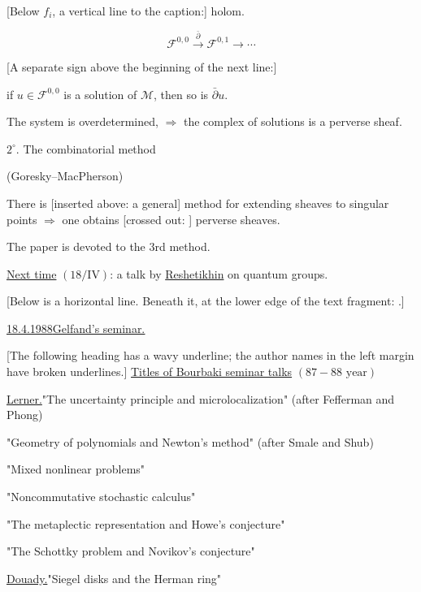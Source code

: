 [Below $f_i$, a vertical line to the caption:] holom.

\begin{equation*}
\mathcal F^{0,0}\overset{\bar\partial}{\longrightarrow}\mathcal F^{0,1}\longrightarrow\cdots
\end{equation*}

[A separate sign above the beginning of the next line:] 

if $u\in\mathcal F^{0,0}$ is a solution of $\mathcal M$, then so is $\bar\partial u$.

The system is overdetermined, $\Rightarrow$ the complex of solutions is a perverse sheaf.

$2^\circ$. The combinatorial method

(Goresky--MacPherson)

There is [inserted above: a general] method for extending sheaves to singular points $\Rightarrow$ one obtains [crossed out: ] perverse sheaves.

The paper is devoted to the $3$rd method.

\underline{Next time} $(18/\mathrm{IV})$: a talk by \underline{Reshetikhin} on quantum groups.

[Below is a horizontal line. Beneath it, at the lower edge of the text fragment: .]

\underline{18.4.1988}\qquad \underline{\underline{Gelfand's seminar.}}

[The following heading has a wavy underline; the author names in the left margin have broken underlines.]
\underline{Titles of Bourbaki seminar talks} $(87-88\text{ year})$

\underline{Lerner.}\quad "The uncertainty principle and microlocalization" (after Fefferman and Phong)

"Geometry of polynomials and Newton's method" (after Smale and Shub)

"Mixed nonlinear problems"

"Noncommutative stochastic calculus"

"The metaplectic representation and Howe's conjecture"

"The Schottky problem and Novikov's conjecture"

\underline{Douady.}\quad "Siegel disks and the Herman ring"

